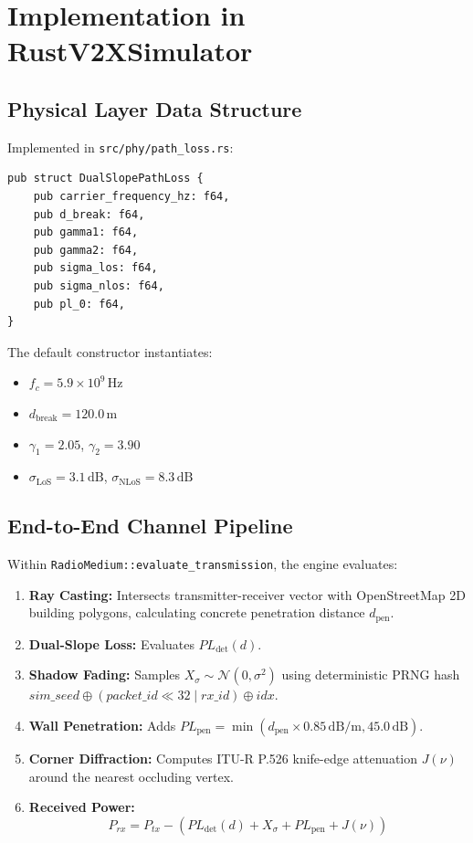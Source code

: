 \documentclass[11pt,a4paper]{article}
\begin{document}
\section{Implementation in RustV2XSimulator}

\subsection{Physical Layer Data Structure}
Implemented in \texttt{src/phy/path\_loss.rs}:
\begin{verbatim}
pub struct DualSlopePathLoss {
    pub carrier_frequency_hz: f64,
    pub d_break: f64,
    pub gamma1: f64,
    pub gamma2: f64,
    pub sigma_los: f64,
    pub sigma_nlos: f64,
    pub pl_0: f64,
}
\end{verbatim}
The default constructor instantiates:
\begin{itemize}[noitemsep]
    \item $f_c = 5.9 \times 10^9\,\text{Hz}$
    \item $d_{\text{break}} = 120.0\,\text{m}$
    \item $\gamma_1 = 2.05$, $\gamma_2 = 3.90$
    \item $\sigma_{\text{LoS}} = 3.1\,\text{dB}$, $\sigma_{\text{NLoS}} = 8.3\,\text{dB}$
\end{itemize}

\subsection{End-to-End Channel Pipeline}
Within \texttt{RadioMedium::evaluate\_transmission}, the engine evaluates:
\begin{enumerate}[noitemsep]
    \item \textbf{Ray Casting:} Intersects transmitter-receiver vector with OpenStreetMap 2D building polygons, calculating concrete penetration distance $d_{\text{pen}}$.
    \item \textbf{Dual-Slope Loss:} Evaluates $PL_{\text{det}}(d)$.
    \item \textbf{Shadow Fading:} Samples $X_\sigma \sim \mathcal{N}(0, \sigma^2)$ using deterministic PRNG hash $sim\_seed \oplus (packet\_id \ll 32 \mid rx\_id) \oplus idx$.
    \item \textbf{Wall Penetration:} Adds $PL_{\text{pen}} = \min(d_{\text{pen}} \times 0.85\,\text{dB/m}, 45.0\,\text{dB})$.
    \item \textbf{Corner Diffraction:} Computes ITU-R P.526 knife-edge attenuation $J(\nu)$ around the nearest occluding vertex.
    \item \textbf{Received Power:}
    \begin{equation}
    P_{rx} = P_{tx} - \left( PL_{\text{det}}(d) + X_\sigma + PL_{\text{pen}} + J(\nu) \right)
    \end{equation}
\end{enumerate}
\end{document}
